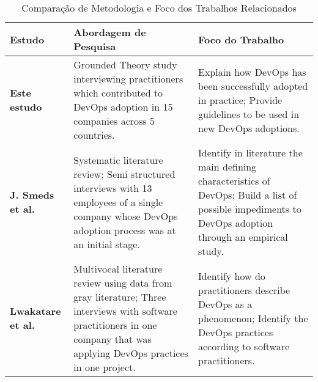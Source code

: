\begin{table}[hb!]
\centering
\caption{Comparação de Metodologia e Foco dos Trabalhos Relacionados}
\label{related_work_table}
\begin{tabular}{|p{3cm}|p{6cm}|p{6cm}|}
\hline

\textbf{Estudo}
& \textbf{Abordagem de Pesquisa}
& \textbf{Foco do Trabalho} \\

\hline

\textbf{Este estudo}

& Grounded Theory study interviewing practitioners which contributed to DevOps
adoption in 15 companies across 5 countries.

& Explain how DevOps has been successfully adopted in practice;\newline
\newline Provide guidelines to be used in new DevOps adoptions. \\

\hline

\textbf{J. Smeds et al.~\cite{devops_a_definition}}

& Systematic literature review; \newline \newline Semi structured interviews
with 13 employees of a single company whose DevOps adoption process was at
an initial stage.

& Identify in literature the main defining characteristics of DevOps; \newline
\newline Build a list of possible impediments to DevOps adoption through an
empirical study. \\

\hline

\textbf{Lwakatare et al.~\cite{extending_dimensions_icsea_16}}

&
Multivocal literature review using data from gray literature; \newline \newline
Three interviews with software practitioners in one company that was applying
DevOps practices in one project.

& Identify how do practitioners describe DevOps as a phenomenon; \newline
\newline Identify the DevOps practices according to software practitioners. \\

\hline


\end{tabular}
\end{table}
